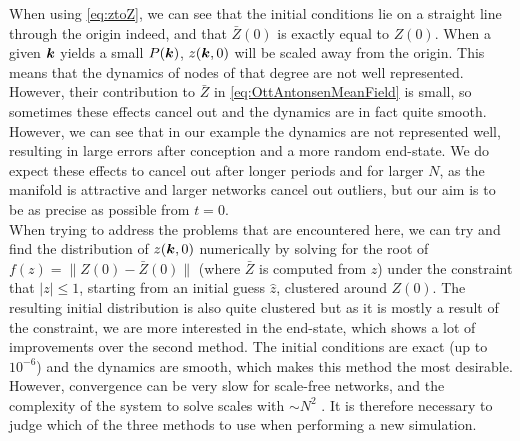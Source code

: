 When using \eqref{eq:ztoZ}, we can see that the initial conditions lie on a straight line through the origin indeed, and that $\bar{Z}(0)$ is exactly equal to $Z(0)$. When a given ${\boldsymbol{k}}$ yields a small $P({\boldsymbol{k}})$, $z({\boldsymbol{k}},0)$ will be scaled away from the origin. This means that the dynamics of nodes of that degree are not well represented. However, their contribution to $\bar{Z}$ in \eqref{eq:OttAntonsenMeanField} is small, so sometimes these effects cancel out and the dynamics are in fact quite smooth. However, we can see that in our example the dynamics are not represented well, resulting in large errors after conception and a more random end-state. We do expect these effects to cancel out after longer periods and for larger $N$, as the manifold is attractive and larger networks cancel out outliers, but our aim is to be as precise as possible from $t=0$. \\

When trying to address the problems that are encountered here, we can try and find the distribution of $z({\boldsymbol{k}},0)$ numerically by solving for the root of $f(z) = \| Z(0) - \bar{Z}(0) \|$ (where $\bar{Z}$ is computed from $z$) under the constraint that $| z | \leq 1$, starting from an initial guess $\hat{z}$, clustered around $Z(0)$. The resulting initial distribution is also quite clustered but as it is mostly a result of the constraint, we are more interested in the end-state, which shows a lot of improvements over the second method. The initial conditions are exact (up to $10^{-6}$) and the dynamics are smooth, which makes this method the most desirable. However, convergence can be very slow for scale-free networks, and the complexity of the system to solve scales with $\sim N^2$ . It is therefore necessary to judge which of the three methods to use when performing a new simulation.


